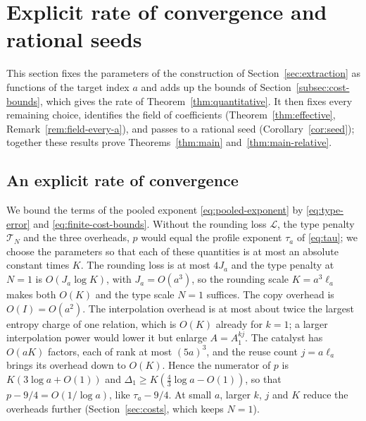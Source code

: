 \section{Explicit rate of convergence and rational seeds}
\label{sec:rate}

This section fixes the parameters of the construction of
Section~\ref{sec:extraction} as functions of the target index \(a\) and
adds up the bounds of Section~\ref{subsec:cost-bounds}, which gives the
rate of Theorem~\ref{thm:quantitative}. It then fixes every remaining
choice, identifies the field of coefficients
(Theorem~\ref{thm:effective}, Remark~\ref{rem:field-every-a}), and
passes to a rational seed (Corollary~\ref{cor:seed}); together these
results prove Theorems~\ref{thm:main} and~\ref{thm:main-relative}.

\subsection{An explicit rate of convergence}
\label{subsec:quantitative}

We bound the terms of the pooled exponent \eqref{eq:pooled-exponent} by
\eqref{eq:type-error} and \eqref{eq:finite-cost-bounds}. Without the
rounding loss \(\mathcal L\), the type penalty \(\mathcal T_N\) and the
three overheads, \(p\) would equal the profile exponent \(\tau_a\) of
\eqref{eq:tau}; we choose the parameters so that each of these
quantities is at most an absolute constant times \(K\). The rounding
loss is at most \(4J_a\) and the type penalty at \(N=1\) is
\(O(J_a\log K)\), with \(J_a=O(a^3)\), so the rounding scale
\(K=a^3\ell_a\) makes both \(O(K)\) and the type scale \(N=1\) suffices.
The copy overhead is \(O(I)=O(a^2)\). The interpolation overhead is at
most about twice the largest entropy charge of one relation, which is
\(O(K)\) already for \(k=1\); a larger interpolation power would lower
it but enlarge \(A=A_1^{kj}\). The catalyst has \(O(aK)\) factors, each
of rank at most \((5a)^3\), and the reuse count \(j=a\ell_a\) brings its
overhead down to \(O(K)\). Hence the numerator of \(p\) is
\(K(3\log a+O(1))\) and \(\Delta_1\ge K(\frac43\log a-O(1))\), so that
\(p-9/4=O(1/\log a)\), like \(\tau_a-9/4\). At small
\(a\), larger \(k\), \(j\) and \(K\) reduce the overheads further
(Section~\ref{sec:costs}, which keeps \(N=1\)).

